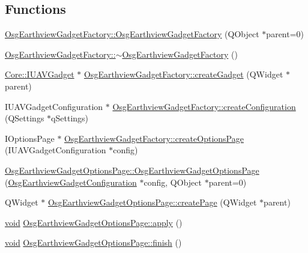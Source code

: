 \subsection*{\-Functions}
\begin{DoxyCompactItemize}
\item 
\hyperlink{group___o_s_g_earth_view_pluging_ga80b08d5dc72dc33d68fb003039d09e79}{\-Osg\-Earthview\-Gadget\-Factory\-::\-Osg\-Earthview\-Gadget\-Factory} (\-Q\-Object $\ast$parent=0)
\item 
\hyperlink{group___o_s_g_earth_view_pluging_ga3287ca5ea93e70d691a0f8f3ed84e4c9}{\-Osg\-Earthview\-Gadget\-Factory\-::$\sim$\-Osg\-Earthview\-Gadget\-Factory} ()
\item 
\hyperlink{class_core_1_1_i_u_a_v_gadget}{\-Core\-::\-I\-U\-A\-V\-Gadget} $\ast$ \hyperlink{group___o_s_g_earth_view_pluging_gaf6044184a496af6c6c7c50c271a6ceef}{\-Osg\-Earthview\-Gadget\-Factory\-::create\-Gadget} (\-Q\-Widget $\ast$parent)
\item 
\-I\-U\-A\-V\-Gadget\-Configuration $\ast$ \hyperlink{group___o_s_g_earth_view_pluging_ga863730abedc7eb805c2f5f9201aadfdc}{\-Osg\-Earthview\-Gadget\-Factory\-::create\-Configuration} (\-Q\-Settings $\ast$q\-Settings)
\item 
\-I\-Options\-Page $\ast$ \hyperlink{group___o_s_g_earth_view_pluging_ga809eda563b3d5d297fc14507d28a122d}{\-Osg\-Earthview\-Gadget\-Factory\-::create\-Options\-Page} (\-I\-U\-A\-V\-Gadget\-Configuration $\ast$config)
\item 
\hyperlink{group___o_s_g_earth_view_pluging_gae7d8f2c382b21dd6d913abc3a5b3354a}{\-Osg\-Earthview\-Gadget\-Options\-Page\-::\-Osg\-Earthview\-Gadget\-Options\-Page} (\hyperlink{class_osg_earthview_gadget_configuration}{\-Osg\-Earthview\-Gadget\-Configuration} $\ast$config, \-Q\-Object $\ast$parent=0)
\item 
\-Q\-Widget $\ast$ \hyperlink{group___o_s_g_earth_view_pluging_gab3f0d2eb9fbf4dca4dcdb6b20c70eb52}{\-Osg\-Earthview\-Gadget\-Options\-Page\-::create\-Page} (\-Q\-Widget $\ast$parent)
\item 
\hyperlink{group___u_a_v_objects_plugin_ga444cf2ff3f0ecbe028adce838d373f5c}{void} \hyperlink{group___o_s_g_earth_view_pluging_ga1c8c1c8cba26cf60acc0c25bbd8b0d23}{\-Osg\-Earthview\-Gadget\-Options\-Page\-::apply} ()
\item 
\hyperlink{group___u_a_v_objects_plugin_ga444cf2ff3f0ecbe028adce838d373f5c}{void} \hyperlink{group___o_s_g_earth_view_pluging_gaa2fbdbeced73248edc1b001ba9294684}{\-Osg\-Earthview\-Gadget\-Options\-Page\-::finish} ()

\end{DoxyCompactItemize}
